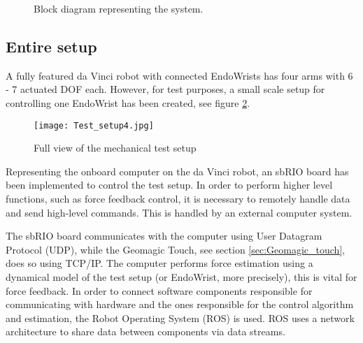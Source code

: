 {\begin{figure}[h]
{
}
\caption{Block diagram representing the system.}
\label{fig:full_setup}
\end{figure}
}
{\color{red}
\subsection{Entire setup}

A fully featured da Vinci robot with connected EndoWrists has four arms with 6 - 7 actuated DOF each.
However, for test purposes, a small scale setup for controlling one EndoWrist has been created, see figure \ref{fig:Mec_d}.

\begin{figure}
    \centering
    \texttt{[image: Test\_setup4.jpg]}
    \caption{Full view of the mechanical test setup}
    \label{fig:Mec_d}
\end{figure}

Representing the onboard computer on the da Vinci robot, an sbRIO board has been implemented to control the test setup. 
In order to perform higher level functions, such as force feedback control, it is necessary to remotely handle data and send high-level commands.
This is handled by an external computer system. %

The sbRIO board communicates with the computer using User Datagram Protocol (UDP), while the Geomagic Touch, see section \ref{sec:Geomagic_touch}, does so using TCP/IP.
The computer performs force estimation using a dynamical model of the test setup (or EndoWrist, more precisely), this is vital for force feedback.
In order to connect software components responsible for communicating with hardware and the ones responsible for the control algorithm and estimation, the Robot Operating System (ROS) is used.
ROS uses a network architecture to share data between components via data streams.





}
